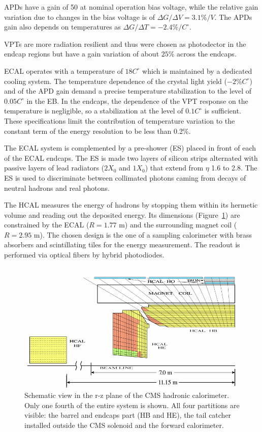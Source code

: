 APDs have a gain of 50 at nominal operation bias voltage, while the relative gain variation due to changes in the bias voltage
is of $\Delta G/\Delta V = 3.1\% /V$. The APDs gain also depends on temperatures as
$\Delta G/\Delta T = -2.4\% /C^{\circ}$. 

VPTs are more radiation resilient and thus were chosen as photodector in the endcap regions
but have a gain variation of about $25\%$ across the endcaps.

ECAL operates with a temperature of $18 C^{\circ}$ which is maintained by a dedicated cooling system.
The temperature dependence of the crystal light yield ($−2\% C^{\circ}$) and of the APD gain
demand a precise temperature stabilization to the level of $0.05 C^{\circ}$ in the EB. In the
endcaps, the dependence of the VPT response on the temperature is negligible,
so a stabilization at the level of $0.1 C^{\circ}$ is sufficient. These specifications limit the contribution
of temperature variation to the constant term of the energy resolution to be less than 0.2$\%$.

The ECAL system is complemented by a pre-shower (ES) placed in front of each of the ECAL endcaps.
The ES is made two layers of silicon strips alternated with passive layers of lead radiators ($2 X_0$ and $1 X_0$)
that extend from $\eta$ 1.6 to 2.8.
The ES is used to discriminate between collimated photons caming from decays of neutral hadrons and
real photons.


The HCAL measures the energy of hadrons by stopping them within its
hermetic volume and reading out the deposited energy. Its dimensions (Figure~\ref{fig:cms_hcal_layout})
are constrained by the ECAL ($R = 1.77$ m) and the surrounding magnet coil
($R = 2.95$ m). The chosen design is the one of a sampling calorimeter with brass absorbers
and scintillating tiles for the energy measurement. The readout is performed via
optical fibers by hybrid photodiodes.

\begin{figure}
  \centering
  \includegraphics[width = 1.\textwidth]{figures/cms/hcal_layout.png}
  \caption{Schematic view in the r-z plane of the CMS hadronic calorimeter. Only one fourth of the
    entire system is shown. All four partitions are visible: the barrel and endcaps part (HB and HE), the
    tail catcher installed outside the CMS solenoid and the forward calorimeter.}
  \label{fig:cms_hcal_layout}
\end{figure}    

